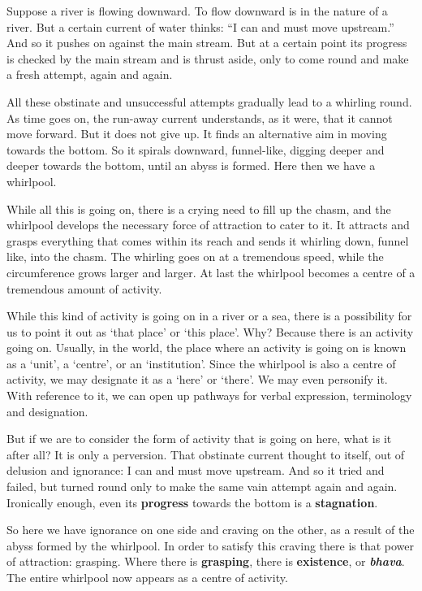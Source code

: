 Suppose a river is flowing downward. To flow downward is in the nature of a river. But a certain current of water thinks: ``I can and must move upstream.'' And so it pushes on against the main stream. But at a certain point its progress is checked by the main stream and is thrust aside, only to come round and make a fresh attempt, again and again.

All these obstinate and unsuccessful attempts gradually lead to a whirling round. As time goes on, the run-away current understands, as it were, that it cannot move forward. But it does not give up. It finds an alternative aim in moving towards the bottom. So it spirals downward, funnel-like, digging deeper and deeper towards the bottom, until an abyss is formed. Here then we have a whirlpool.

While all this is going on, there is a crying need to fill up the chasm, and the whirlpool develops the necessary force of attraction to cater to it. It attracts and grasps everything that comes within its reach and sends it whirling down, funnel like, into the chasm. The whirling goes on at a tremendous speed, while the circumference grows larger and larger. At last the whirlpool becomes a centre of a tremendous amount of activity.

While this kind of activity is going on in a river or a sea, there is a possibility for us to point it out as `that place' or `this place'. Why? Because there is an activity going on. Usually, in the world, the place where an activity is going on is known as a `unit', a `centre', or an `institution'. Since the whirlpool is also a centre of activity, we may designate it as a `here' or `there'. We may even personify it. With reference to it, we can open up pathways for verbal expression, terminology and designation.

But if we are to consider the form of activity that is going on here, what is it after all? It is only a perversion. That obstinate current thought to itself, out of delusion and ignorance: I can and must move upstream. And so it tried and failed, but turned round only to make the same vain attempt again and again. Ironically enough, even its \textbf{progress} towards the bottom is a \textbf{stagnation}.

So here we have ignorance on one side and craving on the other, as a result of the abyss formed by the whirlpool. In order to satisfy this craving there is that power of attraction: grasping. Where there is \textbf{grasping}, there is \textbf{existence}, or \textbf{\emph{bhava}}. The entire whirlpool now appears as a centre of activity.


